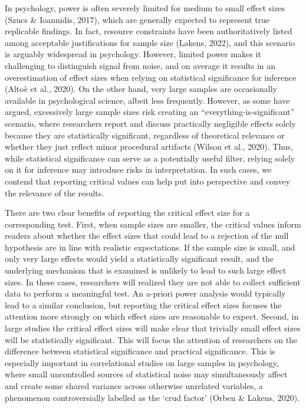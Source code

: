 \documentclass[
  man]{apa7}
\begin{document}
In psychology, power is often severely limited for medium to small effect sizes (Szucs \& Ioannidis, 2017), which are generally expected to represent true replicable findings. In fact, resource constraints have been authoritatively listed among acceptable justifications for sample size (Lakens, 2022), and this scenario is arguably widespread in psychology. However, limited power makes it challenging to distinguish signal from noise, and on average it results in an overestimation of effect sizes when relying on statistical significance for inference (Altoè et al., 2020). On the other hand, very large samples are occasionally available in psychological science, albeit less frequently. However, as some have argued, excessively large sample sizes risk creating an ``everything-is-significant'' scenario, where researchers report and discuss practically negligible effects solely because they are statistically significant, regardless of theoretical relevance or whether they just reflect minor procedural artifacts (Wilson et al., 2020). Thus, while statistical significance can serve as a potentially useful filter, relying solely on it for inference may introduce risks in interpretation. In such cases, we contend that reporting critical values can help put into perspective and convey the relevance of the results.

There are two clear benefits of reporting the critical effect size for a corresponding test. First, when sample sizes are smaller, the critical values inform readers about whether the effect sizes that could lead to a rejection of the null hypothesis are in line with realistic expectations. If the sample size is small, and only very large effects would yield a statistically significant result, and the underlying mechanism that is examined is unlikely to lead to such large effect sizes. In these cases, researchers will realized they are not able to collect sufficient data to perform a meaningful test. An a-priori power analysis would typically lead to a similar conclusion, but reporting the critical effect sizes focuses the attention more strongly on which effect sizes are reasonable to expect. Second, in large studies the critical effect sizes will make clear that trivially small effect sizes will be statistically significant. This will focus the attention of researchers on the difference between statistical significance and practical significance. This is especially important in correlational studies on large samples in psychology, where small uncontrolled sources of statistical noise may simultaneously affect and create some shared variance across otherwise unrelated variables, a phenomenon controversially labelled as the `crud factor' (Orben \& Lakens, 2020).
\end{document}

